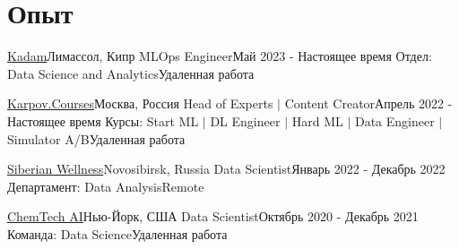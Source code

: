 \section{Опыт}
\resumeSubHeadingListStart

\resumeSubheadingWork
{\href{https://www.kadam.net/}{Kadam}}{Лимассол, Кипр}
{MLOps Engineer}{Май 2023 - Настоящее время}
{Отдел: Data Science and Analytics}{Удаленная работа}
\resumeItemListStart
{}
\resumeItemListEnd

\resumeSubheadingWork
{\href{https://www.karpov.courses/}{Karpov.Courses}}{Москва, Россия}
{Head of Experts $|$ Content Creator}{Апрель 2022 - Настоящее время}
{Курсы: Start ML $|$ DL Engineer $|$ Hard ML $|$ Data Engineer $|$ Simulator A/B}{Удаленная работа}
\resumeItemListStart
{}
\resumeItemListEnd

\resumeSubheadingWork
{\href{https://siberianhealth.com/en}{Siberian Wellness}}{Novosibirsk, Russia}
{Data Scientist}{Январь 2022 - Декабрь 2022}
{Департамент: Data Analysis}{Remote}
\resumeItemListStart
{}
\resumeItemListEnd

\resumeSubheadingWork
{\href{https://www.chmtch.com/}{ChemTech AI}}{Нью-Йорк, США}
{Data Scientist}{Октябрь 2020 - Декабрь 2021}
{Команда: Data Science}{Удаленная работа}
\resumeItemListStart
{}
\resumeItemListEnd

\resumeSubHeadingListEnd
